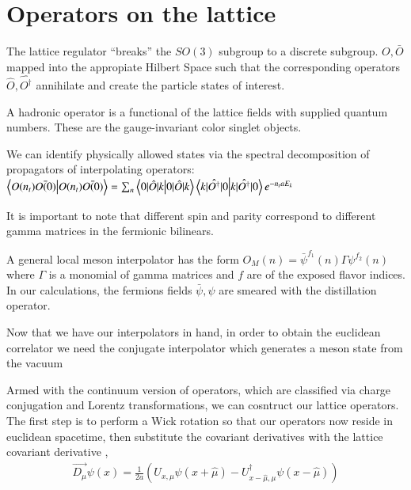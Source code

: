 \section{Operators on the lattice}
The lattice regulator ``breaks'' the $SO(3)$ subgroup to a discrete subgroup. 
$O,\bar{O}$ mapped into the appropiate Hilbert Space such that the corresponding operators $\hat{O} ,\hat{O^\dagger}$  annihilate and create the particle states of interest. 

A hadronic operator is a functional of the lattice fields with supplied quantum numbers. These are the gauge-invariant color singlet objects. 

We can identify physically allowed states via the spectral decomposition of propagators of interpolating operators: 
$\braket{O(n_t)\bar{O(0)}} = \sum_{n}\braket{0|\hat{O}|k} \braket{k|\hat{O^{\dagger}}|0} e^{-n_taE_k}$

It is important to note that different spin and parity correspond to different gamma matrices in the fermionic bilinears.  

A general local meson interpolator has the form $O_M(n) = \bar{\psi}^{f_1}(n)\Gamma\psi^{f_2}(n)$ where $\Gamma$ is a monomial of gamma matrices and $f$ are of the exposed flavor indices. In our calculations, the fermions fields $\bar{\psi},\psi$ are smeared with the distillation operator. 

Now that we have our interpolators in hand, in order to obtain the euclidean correlator we need the conjugate interpolator which generates a meson state from the vacuum 


Armed with the continuum version of operators, which are classified via charge conjugation and Lorentz transformations, we can cosntruct our lattice operators. The first step is to perform a Wick rotation so that our operators now reside in euclidean spacetime, then substitute the covariant derivatives with the lattice covariant derivative \cite{G_ckeler_1996}, 
\begin{align}
    \overrightarrow{D_\mu}\psi(x) = \frac{1}{2a}(U_{x,\mu}\psi(x + \hat{\mu}) - U_{x-\hat{\mu},\mu}^\dagger\psi(x - \hat{\mu}))
\end{align}

